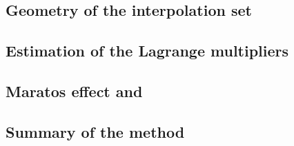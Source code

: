 \subsection{Geometry of the interpolation set}

\subsection{Estimation of the Lagrange multipliers}

\subsection{Maratos effect and }

\subsection{Summary of the method}
